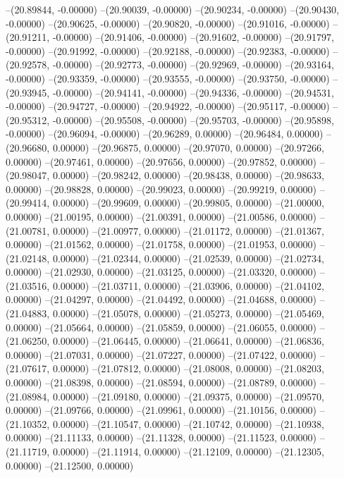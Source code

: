 --(20.89844, -0.00000)
--(20.90039, -0.00000)
--(20.90234, -0.00000)
--(20.90430, -0.00000)
--(20.90625, -0.00000)
--(20.90820, -0.00000)
--(20.91016, -0.00000)
--(20.91211, -0.00000)
--(20.91406, -0.00000)
--(20.91602, -0.00000)
--(20.91797, -0.00000)
--(20.91992, -0.00000)
--(20.92188, -0.00000)
--(20.92383, -0.00000)
--(20.92578, -0.00000)
--(20.92773, -0.00000)
--(20.92969, -0.00000)
--(20.93164, -0.00000)
--(20.93359, -0.00000)
--(20.93555, -0.00000)
--(20.93750, -0.00000)
--(20.93945, -0.00000)
--(20.94141, -0.00000)
--(20.94336, -0.00000)
--(20.94531, -0.00000)
--(20.94727, -0.00000)
--(20.94922, -0.00000)
--(20.95117, -0.00000)
--(20.95312, -0.00000)
--(20.95508, -0.00000)
--(20.95703, -0.00000)
--(20.95898, -0.00000)
--(20.96094, -0.00000)
--(20.96289, 0.00000)
--(20.96484, 0.00000)
--(20.96680, 0.00000)
--(20.96875, 0.00000)
--(20.97070, 0.00000)
--(20.97266, 0.00000)
--(20.97461, 0.00000)
--(20.97656, 0.00000)
--(20.97852, 0.00000)
--(20.98047, 0.00000)
--(20.98242, 0.00000)
--(20.98438, 0.00000)
--(20.98633, 0.00000)
--(20.98828, 0.00000)
--(20.99023, 0.00000)
--(20.99219, 0.00000)
--(20.99414, 0.00000)
--(20.99609, 0.00000)
--(20.99805, 0.00000)
--(21.00000, 0.00000)
--(21.00195, 0.00000)
--(21.00391, 0.00000)
--(21.00586, 0.00000)
--(21.00781, 0.00000)
--(21.00977, 0.00000)
--(21.01172, 0.00000)
--(21.01367, 0.00000)
--(21.01562, 0.00000)
--(21.01758, 0.00000)
--(21.01953, 0.00000)
--(21.02148, 0.00000)
--(21.02344, 0.00000)
--(21.02539, 0.00000)
--(21.02734, 0.00000)
--(21.02930, 0.00000)
--(21.03125, 0.00000)
--(21.03320, 0.00000)
--(21.03516, 0.00000)
--(21.03711, 0.00000)
--(21.03906, 0.00000)
--(21.04102, 0.00000)
--(21.04297, 0.00000)
--(21.04492, 0.00000)
--(21.04688, 0.00000)
--(21.04883, 0.00000)
--(21.05078, 0.00000)
--(21.05273, 0.00000)
--(21.05469, 0.00000)
--(21.05664, 0.00000)
--(21.05859, 0.00000)
--(21.06055, 0.00000)
--(21.06250, 0.00000)
--(21.06445, 0.00000)
--(21.06641, 0.00000)
--(21.06836, 0.00000)
--(21.07031, 0.00000)
--(21.07227, 0.00000)
--(21.07422, 0.00000)
--(21.07617, 0.00000)
--(21.07812, 0.00000)
--(21.08008, 0.00000)
--(21.08203, 0.00000)
--(21.08398, 0.00000)
--(21.08594, 0.00000)
--(21.08789, 0.00000)
--(21.08984, 0.00000)
--(21.09180, 0.00000)
--(21.09375, 0.00000)
--(21.09570, 0.00000)
--(21.09766, 0.00000)
--(21.09961, 0.00000)
--(21.10156, 0.00000)
--(21.10352, 0.00000)
--(21.10547, 0.00000)
--(21.10742, 0.00000)
--(21.10938, 0.00000)
--(21.11133, 0.00000)
--(21.11328, 0.00000)
--(21.11523, 0.00000)
--(21.11719, 0.00000)
--(21.11914, 0.00000)
--(21.12109, 0.00000)
--(21.12305, 0.00000)
--(21.12500, 0.00000)
